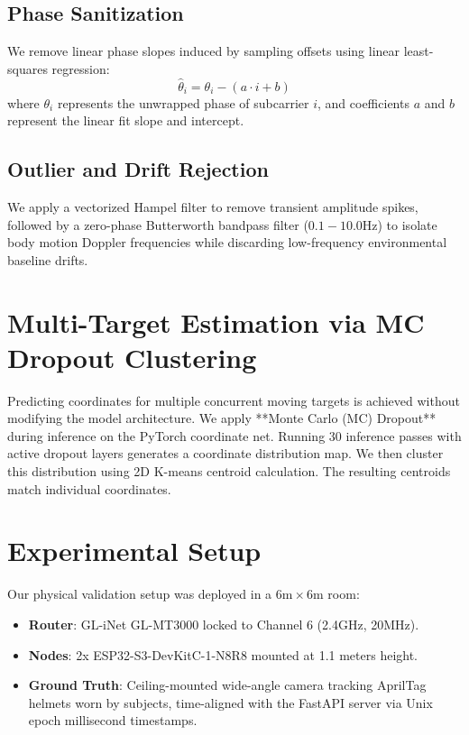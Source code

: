\documentclass{article}
\begin{document}
\subsection{Phase Sanitization}
We remove linear phase slopes induced by sampling offsets using linear least-squares regression:
\begin{equation}
    \hat{\theta}_i = \theta_i - (a \cdot i + b)
\end{equation}
where $\theta_i$ represents the unwrapped phase of subcarrier $i$, and coefficients $a$ and $b$ represent the linear fit slope and intercept.
\subsection{Outlier and Drift Rejection}
We apply a vectorized Hampel filter to remove transient amplitude spikes, followed by a zero-phase Butterworth bandpass filter ($0.1-10.0$Hz) to isolate body motion Doppler frequencies while discarding low-frequency environmental baseline drifts.

\section{Multi-Target Estimation via MC Dropout Clustering}
Predicting coordinates for multiple concurrent moving targets is achieved without modifying the model architecture. We apply **Monte Carlo (MC) Dropout** during inference on the PyTorch coordinate net. Running 30 inference passes with active dropout layers generates a coordinate distribution map. We then cluster this distribution using 2D K-means centroid calculation. The resulting centroids match individual coordinates.

\section{Experimental Setup}
Our physical validation setup was deployed in a $6\text{m} \times 6\text{m}$ room:
\begin{itemize}
    \item \textbf{Router}: GL-iNet GL-MT3000 locked to Channel 6 (2.4GHz, 20MHz).
    \item \textbf{Nodes}: 2x ESP32-S3-DevKitC-1-N8R8 mounted at 1.1 meters height.
    \item \textbf{Ground Truth}: Ceiling-mounted wide-angle camera tracking AprilTag helmets worn by subjects, time-aligned with the FastAPI server via Unix epoch millisecond timestamps.
\end{itemize}
\end{document}

